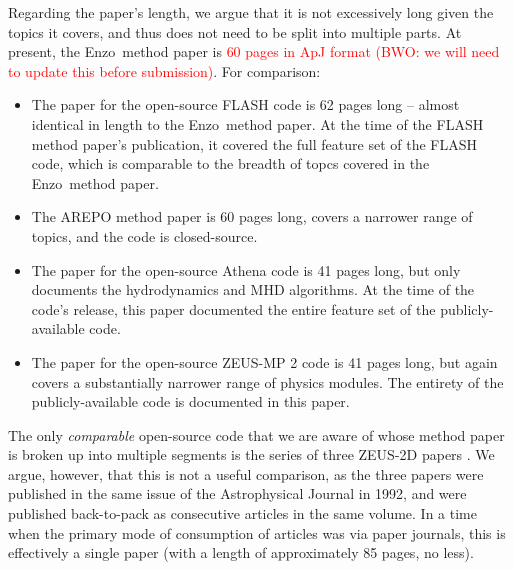\documentclass[11pt]{article}
\newcommand{\red}[1]{\textcolor{red}{#1}}
\newcommand{\code}[1]{\textsf{#1}}
\newcommand{\enzo}{\code{Enzo}}
\begin{document}
Regarding the paper's length, we argue that it is not excessively long
given the topics it covers, and thus does not need to be split into
multiple parts.  At present, the \enzo\ method paper is \red{60 pages
in ApJ format (BWO: we will need to update this before submission)}.
For comparison:

\begin{itemize}
\item The paper for the open-source FLASH code
\citep{2000ApJS..131..273F} is 62 pages long -- almost identical in
length to the \enzo\ method paper.  At the time of the FLASH method paper's
publication, it covered the full feature set of the FLASH code, which
is comparable to the breadth of topcs covered in the \enzo\ method
paper.

\item The AREPO method paper \citep{2010MNRAS.401..791S} is 60 pages
long, covers a narrower range of topics, and the code is
closed-source.

\item The paper for the open-source Athena code
\citep{2008ApJS..178..137S} is 41 pages long, but only documents the
hydrodynamics and MHD algorithms.  At the time of the code's release,
this paper documented the entire feature set of the publicly-available
code.

\item The paper for the open-source ZEUS-MP 2 code
\citep{2006ApJS..165..188H} is 41 pages long, but again covers a
substantially narrower range of physics modules.  The entirety of the
publicly-available code is documented in this paper.
\end{itemize}

The only \textit{comparable} open-source code that we are aware of
whose method paper is broken up into multiple segments is the series
of three ZEUS-2D papers \citep{1992ApJS...80..753S,
1992ApJS...80..791S, 1992ApJS...80..819S}.  We argue, however, that
this is not a useful comparison, as the three papers were published in
the same issue of the Astrophysical Journal in 1992, and were
published back-to-pack as consecutive articles in the same volume.  In
a time when the primary mode of consumption of articles was via paper
journals, this is effectively a single paper (with a length of
approximately 85 pages, no less).
\end{document}

